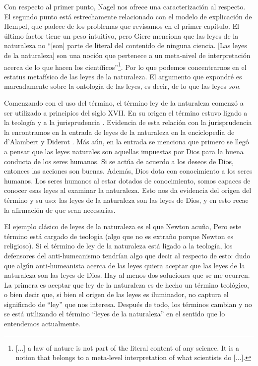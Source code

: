 Con respecto al primer punto, Nagel nos ofrece una caracterización al respecto. El segundo punto está estrechamente relacionado con el modelo de explicación de Hempel, que padece de los problemas que revisamos en el primer capítulo. El último factor tiene un peso intuitivo, pero Giere \citeyear[p. 69]{Giere2006} menciona que las leyes de la naturaleza no ``[son] parte de literal del contenido de ninguna ciencia. [Las leyes de la naturaleza] son una noción que pertenece a un meta-nivel de interpretación acerca de lo que hacen los científicos''\footnote{[...] a law of nature is not part of the literal content of any science. It is a notion that belongs to a meta-level interpretation of what scientists do [...].}. Por lo que podemos concentrarnos en el estatus metafísico de las leyes de la naturaleza. El argumento que expondré es marcadamente sobre la ontología de las leyes, es decir, de lo que las leyes \textit{son}.

Comenzando con el uso del término, el término ley de la naturaleza comenzó a ser utilizado a principios del siglo XVII. En su origen el término estuvo ligado a la teología y a la jurisprudencia \cite{Giere2006, Giere1999}. Evidencia de esta relación con la jurisprudencia la encontramos en la entrada de leyes de la naturaleza en la enciclopedia de d'Alambert y Diderot \cite{lawna}. Más aún, en la entrada se menciona que primero se llegó a pensar que las leyes naturales son aquellas impuestas por Dios para la buena conducta de los seres humanos. Si se actúa de acuerdo a los deseos de Dios, entonces las acciones son buenas. Además, Dios dota con conocimiento a los seres humanos. Los seres humanos al estar dotados de conocimiento, somos capaces de conocer esas leyes al examinar la naturaleza. Esto nos da evidencia del origen del término y su uso: las leyes de  la naturaleza son las leyes de Dios, y en esto recae la afirmación de que sean necesarias.

El ejemplo clásico de leyes de la naturaleza es el que Newton acuña, Pero este término está cargado de teología (algo que no es extraño porque Newton es religioso). Si el término de ley de la naturaleza está ligado a la teología, los defensores del anti-humeanismo tendrían algo que decir al respecto de esto: dudo que algún anti-humeanista acerca de las leyes quiera aceptar que las leyes de la naturaleza son las leyes de Dios. Hay al menos dos soluciones que se me ocurren. La primera es aceptar que ley de la naturaleza es de hecho un término teológico, o bien decir que, si bien el origen de las leyes es iluminador, no captura el significado de ``ley'' que nos interesa. Después de todo, los términos cambian y no se está utilizando el término ``leyes de la naturaleza'' en el sentido que lo entendemos actualmente.


